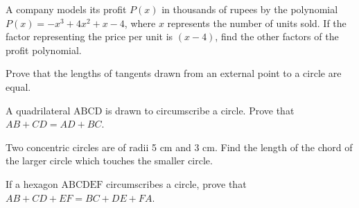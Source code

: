\documentclass[12pt,a4paper]{exam}
\begin{document}
\begin{questions}
\question[5] A company models its profit $P(x)$ in thousands of rupees by the polynomial $P(x) = -x^3 + 4x^2 + x - 4$, where $x$ represents the number of units sold. If the factor representing the price per unit is $(x-4)$, find the other factors of the profit polynomial.
\vspace{0.15cm}

\question[5] Prove that the lengths of tangents drawn from an external point to a circle are equal.
\vspace{0.15cm}

\question[5] A quadrilateral $\text{ABCD}$ is drawn to circumscribe a circle. Prove that $AB + CD = AD + BC$.
\vspace{0.15cm}

\question[5] Two concentric circles are of radii 5 cm and 3 cm. Find the length of the chord of the larger circle which touches the smaller circle.
\vspace{0.15cm}

\question[5] If a hexagon $\text{ABCDEF}$ circumscribes a circle, prove that $AB + CD + EF = BC + DE + FA$.
\vspace{0.15cm}

\end{questions}
\bigskip
\end{document}
